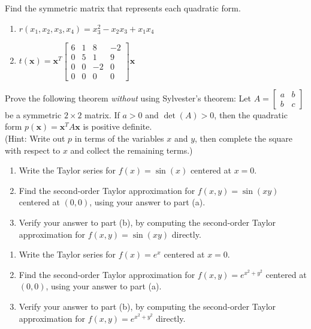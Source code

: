 \documentclass{ximera}
\begin{document}
\begin{problem}
Find the symmetric matrix that represents each quadratic form.

\begin{enumerate}

\item $r(x_1,x_2,x_3,x_4)=x_3^2-x_2x_3+x_1x_4$\\

\item $t(\mathbf{x})=\mathbf{x}^T\left[ \begin{array}{cccc}
6 & 1 & 8 & -2 \\
0 & 5 & 1 & 9 \\
0 & 0 & -2 & 0 \\
0 & 0 & 0 & 0 \end{array} \right]\mathbf{x}$\\
\end{enumerate}
\end{problem}

\begin{problem}
Prove the following theorem \emph{without} using Sylvester's theorem: Let $A=\left[ \begin{array}{cc}
a & b  \\
b & c \end{array} \right]$ be a symmetric $2\times 2$ matrix.   If $a>0$ and $\det(A)>0$, then the quadratic form $p(\mathbf{x})=\mathbf{x}^TA\mathbf{x}$ is positive definite.\\

(Hint: Write out $p$ in terms of the variables $x$ and $y$, then complete the square with respect to $x$ and collect the remaining terms.)
\end{problem}

\begin{problem}
 \begin{enumerate}
\item Write the Taylor series for $f(x) = \sin(x)$ centered at $x = 0$.
\item Find the second-order Taylor approximation for $f(x,y) = \sin(xy)$ centered at $(0,0)$, using your answer to part (a).
\item Verify your answer to part (b), by computing the second-order Taylor approximation for $f(x,y) = \sin(xy)$ directly.
\end{enumerate}
\end{problem}

\begin{problem} \begin{enumerate}
\item Write the Taylor series for $f(x) = e^{x}$ centered at $x = 0$.
\item Find the second-order Taylor approximation for $f(x,y) = e^{x^2+y^2}$ centered at $(0,0)$, using your answer to part (a).
\item Verify your answer to part (b), by computing the second-order Taylor approximation for $f(x,y) = e^{x^2+y^2}$ directly.
\end{enumerate}
\end{problem}
\end{document}
